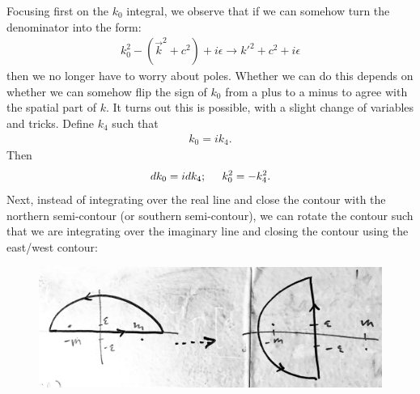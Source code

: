\documentclass{book}
\theoremstyle{definition}
\begin{document}
Focusing first on the $k_0$ integral, we observe that if we can somehow turn the denominator into the form:
\begin{align}
k_0^2 - (\vec{k}^2 + c^2) + i\epsilon \to k'^2 + c^2 + i\epsilon
\end{align}
then we no longer have to worry about poles. Whether we can do this depends on whether we can somehow flip the sign of $k_0$ from a plus to a minus to agree with the spatial part of $k$. It turns out this is possible, with a slight change of variables and tricks. Define $k_4$ such that
\begin{align}
k_0 = ik_4.
\end{align}
Then 
\begin{align}
dk_0 = idk_4; \hspace{0.5cm} k_0^2 = -k_4^2.
\end{align}
Next, instead of integrating over the real line and close the contour with the northern semi-contour (or southern semi-contour), we can rotate the contour such that we are integrating over the imaginary line and closing the contour using the east/west contour: 
\begin{figure}[!htb]
	\centering
	\includegraphics[scale=0.1]{rotate}
\end{figure}
\end{document}
